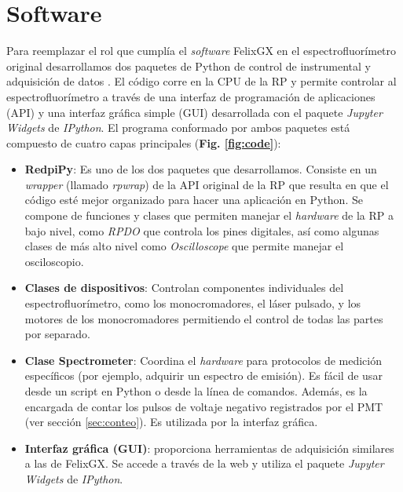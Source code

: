
\renewcommand{\tablename}{\textbf{Tabla}}

\section{Software} \label{sec:software}

Para reemplazar el rol que cumplía el \textit{software} FelixGX en el espectrofluorímetro original desarrollamos dos paquetes de Python de control de instrumental y adquisición de datos \cite{napoli_tdinapoli_2024,grecco_hgrecco_2024}.
El código corre en la CPU de la RP y permite controlar al espectrofluorímetro a través de una interfaz de programación de aplicaciones (API) y una interfaz gráfica simple (GUI) desarrollada con el paquete \textit{Jupyter Widgets} de \textit{IPython}.
El programa conformado por ambos paquetes está compuesto de cuatro capas principales (\textbf{Fig. \ref{fig:code}}):

\begin{itemize}
     \item \textbf{RedpiPy}: Es uno de los dos paquetes que desarrollamos. Consiste en un \textit{wrapper} (llamado \textit{rpwrap}) de la API original de la RP que resulta en que el código esté mejor organizado para hacer una aplicación en Python. Se compone de funciones y clases que permiten manejar el \textit{hardware} de la RP a bajo nivel, como \textit{RPDO} que controla los pines digitales, así como algunas clases de más alto nivel como \textit{Oscilloscope} que permite manejar el osciloscopio.
     \item \textbf{Clases de dispositivos}: Controlan componentes individuales del espectrofluorímetro, como los monocromadores, el láser pulsado, y los motores de los monocromadores permitiendo el control de todas las partes por separado. 
     \item \textbf{Clase Spectrometer}: Coordina el \textit{hardware} para protocolos de medición específicos (por ejemplo, adquirir un espectro de emisión). Es fácil de usar desde un script en Python o desde la línea de comandos. Además, es la encargada de contar los pulsos de voltaje negativo registrados por el PMT (ver sección \ref{sec:conteo}). Es utilizada por la interfaz gráfica.
     \item \textbf{Interfaz gráfica (GUI)}: proporciona herramientas de adquisición similares a las de FelixGX. Se accede a través de la web y utiliza el paquete \textit{Jupyter Widgets} de \textit{IPython}.
\end{itemize}

